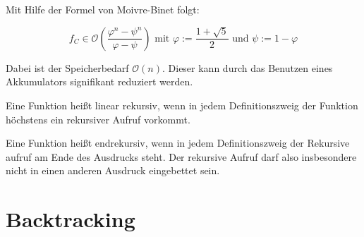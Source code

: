 Mit Hilfe der Formel von Moivre-Binet folgt:

\[f_C \in \mathcal{O} \left (\frac{\varphi^n- \psi^n}{\varphi - \psi} \right) \text{ mit } \varphi := \frac{1+ \sqrt{5}}{2} \text{ und }\psi := 1 - \varphi\]

Dabei ist der Speicherbedarf $\mathcal{O}(n)$. Dieser kann durch
das Benutzen eines Akkumulators signifikant reduziert werden.

\begin{definition}
    Eine Funktion heißt linear rekursiv, wenn in jedem Definitionszweig
    der Funktion höchstens ein rekursiver Aufruf vorkommt.
\end{definition}

\begin{definition}
    Eine Funktion heißt endrekursiv, wenn in jedem Definitionszweig
    der Rekursive aufruf am Ende des Ausdrucks steht. Der rekursive
    Aufruf darf also insbesondere nicht in einen anderen Ausdruck
    eingebettet sein.
\end{definition}


\section{Backtracking}

